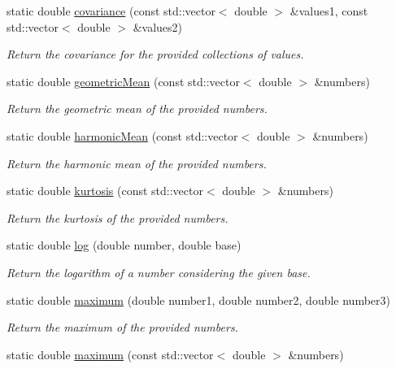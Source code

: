 \begin{DoxyCompactItemize}
static double \hyperlink{classmultiscale_1_1Numeric_a574e8c0824ad8e441898e4857816585a}{covariance} (const std\-::vector$<$ double $>$ \&values1, const std\-::vector$<$ double $>$ \&values2)
\begin{DoxyCompactList}\small\item\em \-Return the covariance for the provided collections of values. \end{DoxyCompactList}\item 
static double \hyperlink{classmultiscale_1_1Numeric_a53023741b672ebb4790bc2e89dbe1ee9}{geometric\-Mean} (const std\-::vector$<$ double $>$ \&numbers)
\begin{DoxyCompactList}\small\item\em \-Return the geometric mean of the provided numbers. \end{DoxyCompactList}\item 
static double \hyperlink{classmultiscale_1_1Numeric_a7ed4c2e74893a486e639051abfbbcdb7}{harmonic\-Mean} (const std\-::vector$<$ double $>$ \&numbers)
\begin{DoxyCompactList}\small\item\em \-Return the harmonic mean of the provided numbers. \end{DoxyCompactList}\item 
static double \hyperlink{classmultiscale_1_1Numeric_a71ef1e4e0e845b64bcb06a27b9f8fbd3}{kurtosis} (const std\-::vector$<$ double $>$ \&numbers)
\begin{DoxyCompactList}\small\item\em \-Return the kurtosis of the provided numbers. \end{DoxyCompactList}\item 
static double \hyperlink{classmultiscale_1_1Numeric_a27b50deac29d8aca5c41c8b19fba43e9}{log} (double number, double base)
\begin{DoxyCompactList}\small\item\em \-Return the logarithm of a number considering the given base. \end{DoxyCompactList}\item 
static double \hyperlink{classmultiscale_1_1Numeric_a54d5578d5980315b7bade31a5655cd72}{maximum} (double number1, double number2, double number3)
\begin{DoxyCompactList}\small\item\em \-Return the maximum of the provided numbers. \end{DoxyCompactList}\item 
static double \hyperlink{classmultiscale_1_1Numeric_ab55b4d890c6221a8e10b37a0e5f2cbdc}{maximum} (const std\-::vector$<$ double $>$ \&numbers)

\end{DoxyCompactItemize}
